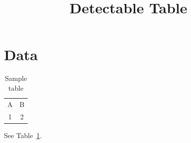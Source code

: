 \documentclass[letterpaper]{article}
\begin{document}
\title{Detectable Table}\author{}\date{}\maketitle
\section{Data}
\begin{table}[h]
\centering
\caption{Sample table}\label{tab:one}
\begin{tabular}{cc}A & B\\1 & 2\end{tabular}
\end{table}
See Table~\ref{tab:one}.
\end{document}

